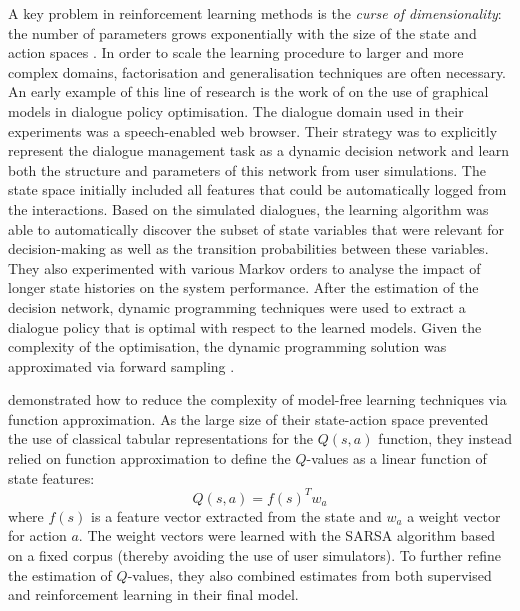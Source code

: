 A key problem in reinforcement learning methods is the \textit{curse of dimensionality}: the number of parameters grows exponentially with the size of the state and action spaces \citep{citeulike:112017}.  In order to scale the learning procedure to larger and more complex domains, factorisation and generalisation techniques are often necessary.  An early example of this line of research is the work of \cite{PaekC06} on the use of graphical models in dialogue policy optimisation. The dialogue domain used in their experiments was a speech-enabled web browser.  Their strategy was to explicitly represent the dialogue management task as a dynamic decision network and learn both the structure and parameters of this network from user simulations.  The state space initially included all features that could be automatically logged from the interactions.  Based on the simulated dialogues, the learning algorithm was able to automatically discover the subset of state variables that were relevant for decision-making as well as the transition probabilities between these variables.   They also experimented with various Markov orders to analyse the impact of longer state histories on the system performance.  After the estimation of the decision network, dynamic programming techniques were used to extract a dialogue policy that is optimal with respect to the learned models. Given the complexity of the optimisation, the dynamic programming solution was approximated via forward sampling \citep{Kearns99asparse}. 

\cite{Henderson:2008} demonstrated how to reduce the complexity of model-free learning techniques via function approximation.  As the large size of their state-action space prevented the use of classical tabular representations for the $Q(s,a)$ function, they instead relied on function approximation to define the $Q$-values as a linear function of state features:
\begin{equation}
Q(s,a) = f(s)^{T} w_a 
\end{equation}
where $f(s)$ is a feature vector extracted from the state and $w_a$ a weight vector for action $a$. The weight vectors were learned with the SARSA algorithm based on a fixed corpus (thereby avoiding the use of user simulators). To further refine the estimation of $Q$-values, they also combined estimates from both supervised and reinforcement learning in their final model. 

